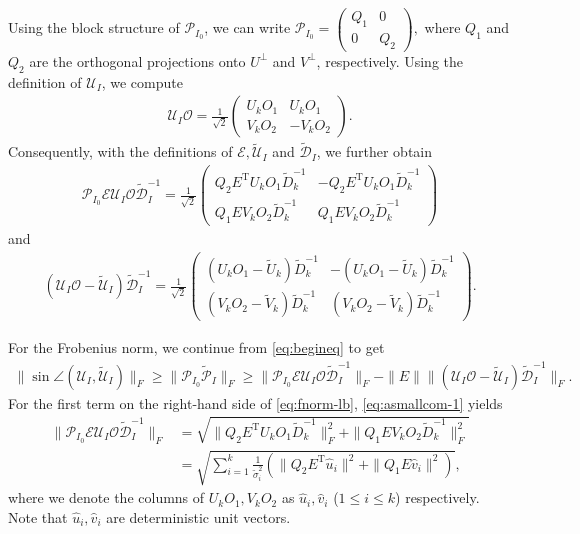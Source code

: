 \documentclass[reqno]{amsart}
\newcommand{\T}{\mathrm{T}}
\theoremstyle{plain}
\theoremstyle{definition}
\begin{document}
Using the block structure of $\mathcal P_{I_0}$, we can write $\mathcal P_{I_0} = \begin{pmatrix}
Q_1 & 0\\
0&Q_2
\end{pmatrix},
$
where $Q_1$ and $Q_2$ are the orthogonal projections onto $U^{\perp}$ and $V^{\perp} $, respectively. Using the definition of $\mathcal U_I$, we compute
\begin{align*}
\mathcal U_I \mathcal O = \frac{1}{\sqrt 2}\begin{pmatrix}
U_k O_1 & U_k O_1\\
V_k O_2 & -V_k O_2
\end{pmatrix}.
\end{align*}
Consequently, with the definitions of $\mathcal E, \widetilde{\mathcal U}_{I}$ and $\widetilde{\mathcal D}_I$, we further obtain
 \begin{align}\label{eq:asmallcom-1}
 \mathcal P_{I_0} \mathcal E {\mathcal U}_{I}\mathcal O \widetilde{\mathcal D}_I^{-1} = \frac{1}{\sqrt 2}\begin{pmatrix}
Q_2 E^\T U_k O_1\widetilde{D}_k^{-1} & -Q_2 E^\T U_k O_1 \widetilde{D}_k^{-1}\\
Q_1 E V_k O_2\widetilde{D}_k^{-1} & Q_1 E V_k O_2  \widetilde{D}_k^{-1}
\end{pmatrix}
\end{align}
and
\begin{align}\label{eq:asmallcom-2}
({\mathcal U}_{I}\mathcal O- \widetilde{\mathcal U}_{I}) \widetilde{\mathcal D}_I^{-1} =\frac{1}{\sqrt 2}\begin{pmatrix}
(U_k O_1 - \widetilde{U}_k)\widetilde{D}_k^{-1} & -(U_k O_1 - \widetilde{U}_k)\widetilde{D}_k^{-1} \\
(V_k O_2 - \widetilde{V}_k)\widetilde{D}_k^{-1} & (V_k O_2 - \widetilde{V}_k)\widetilde{D}_k^{-1}
\end{pmatrix}.
\end{align}

For the Frobenius norm, we continue from \eqref{eq:begineq} to get
\begin{align}\label{eq:fnorm-lb}
\|\sin \angle (\mathcal U_{I}, \widetilde{\mathcal U}_{I})\|_F \ge \|\mathcal P_{I_0} \widetilde{\mathcal P}_{I}\|_F \ge \|\mathcal P_{I_0} \mathcal E {\mathcal U}_{I}\mathcal O \widetilde{\mathcal D}_I^{-1}\|_F - \|E\| \|({\mathcal U}_{I}\mathcal O- \widetilde{\mathcal U}_{I}) \widetilde{\mathcal D}_I^{-1}\|_F.
\end{align}
For the first term on the right-hand side of \eqref{eq:fnorm-lb}, \eqref{eq:asmallcom-1} yields
\begin{align}\label{eq:061625-1}
\|\mathcal P_{I_0} \mathcal E {\mathcal U}_{I}\mathcal O \widetilde{\mathcal D}_I^{-1}\|_F &= \sqrt{\|Q_2 E^\T U_k O_1\widetilde{D}_k^{-1}\|_F^2 + \|Q_1 E V_k O_2\widetilde{D}_k^{-1} \|_F^2}\nonumber\\
&=\sqrt{\sum_{i=1}^k \frac{1}{\widetilde{\sigma}_i^2}\left(  \|Q_2 E^\T \hat{u}_i\|^2 +  \|Q_1 E \hat{v}_i\|^2 \right)}, 
\end{align}
where we denote the columns of $U_k O_1, V_k O_2$ as $ \hat{u}_i,  \hat{v}_i$ ($1\le i \le k$) respectively. Note that $ \hat{u}_i,  \hat{v}_i$ are deterministic unit vectors. 
\end{document}
